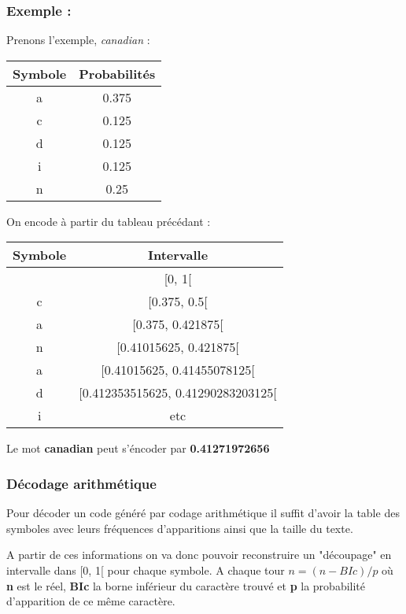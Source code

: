 \subsubsection{Exemple :}
\par Prenons l'exemple, \textit{canadian} : \\ 

\begin{tabular}{|c|c|}
    \hline
    Symbole & Probabilités \\
    \hline
    a & 0.375\\
    \hline
    c & 0.125\\
    \hline
    d & 0.125\\
    \hline
    i & 0.125\\
    \hline
    n & 0.25\\
    \hline

\end{tabular}

\par On encode à partir du tableau précédant :

\begin{tabular}{|c|c|}
    \hline
    Symbole & Intervalle \\
    \hline
     & [0, 1[\\
    \hline
    c & [0.375, 0.5[\\
    \hline
    a & [0.375, 0.421875[\\
    \hline
    n & [0.41015625, 0.421875[\\
    \hline
    a & [0.41015625, 0.41455078125[\\
    \hline
    d & [0.412353515625, 0.41290283203125[\\
    \hline
    i & etc\\
    \hline
\end{tabular}

Le mot \textbf{canadian} peut s'éncoder par \textbf{0.41271972656}

\subsubsection{Décodage arithmétique}

\par Pour décoder un code généré par codage arithmétique il suffit d'avoir la table des symboles avec leurs fréquences d'apparitions ainsi que la taille du texte. 

\par A partir de ces informations on va donc pouvoir reconstruire un "découpage" en intervalle dans [0, 1[ pour chaque symbole. A chaque tour $n = (n - BIc) / p$ où \textbf{n} est le réel, \textbf{BIc} la borne inférieur du caractère trouvé et \textbf{p} la probabilité d'apparition de ce même caractère.  

